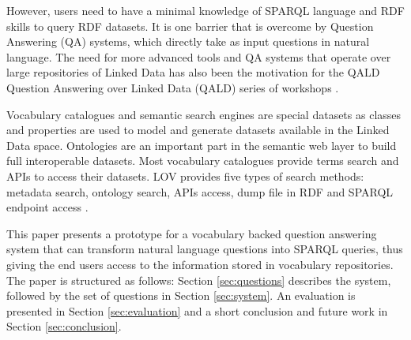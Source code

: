 \documentclass[runningheads,a4paper]{llncs}
\begin{document}
However, users need to have a minimal knowledge of SPARQL language and RDF skills to query  RDF datasets. It is one barrier that is overcome by Question Answering (QA) systems, which directly take as input questions in natural language. The need for more advanced tools and QA systems that operate over large repositories of Linked Data has also been the motivation for the QALD Question Answering over Linked Data (QALD) series of workshops \cite{lopezetal2013}. 
 
Vocabulary catalogues and semantic search engines are special datasets as classes and properties are used to model and generate datasets available in the Linked Data space. Ontologies are an important part in the semantic web layer to build full interoperable datasets. Most vocabulary catalogues provide terms search and APIs to access their datasets. LOV provides five types of search methods: metadata search, ontology search, APIs access, dump file in RDF and SPARQL endpoint access \cite{vandenbusschelov}.


This paper presents a prototype for a vocabulary backed question answering system that can transform natural language questions into SPARQL queries, thus giving the end users access to the information stored in vocabulary repositories. The paper is structured as follows: Section \ref{sec:questions} describes the system, followed by the set of questions in Section \ref{sec:system}. An evaluation is presented in Section \ref{sec:evaluation} and a short conclusion and future work in Section \ref{sec:conclusion}.  




 	 
\end{document}
